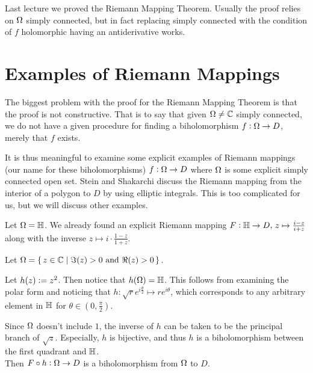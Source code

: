 \setcounter{section}{0}
\setcounter{theorem}{0}


Last lecture we proved the Riemann Mapping Theorem. Usually the proof relies on $\Omega$ simply connected, but in fact replacing simply connected with the condition of $f$ holomorphic having an antiderivative works.

\section{Examples of Riemann Mappings}


The biggest problem with the proof for the Riemann Mapping Theorem is that the proof is not constructive. That is to say that given $\Omega \neq \mathbb{C}$ simply connected, we do not have a given procedure for finding a biholomorphism $f : \Omega \to D$, merely that $f$ exists.

It is thus meaningful to examine some explicit examples of Riemann mappings (our name for these biholomorphisms) $ f : \Omega \to D $ where $\Omega$ is some explicit simply connected open set. Stein and Shakarchi discuss the Riemann mapping from the interior of a polygon to $D$ by using elliptic integrals. This is too complicated for us, but we will discuss other examples.

\begin{example}

Let $\Omega = \mathbb{H}$. We already found an explicit Riemann mapping $F : \mathbb{H} \to D, \, z \mapsto \frac{i - z}{i+z}$ along with the inverse $z \mapsto i \cdot \frac{1-z}{1+z}$.

\end{example}

\begin{example}
Let $\Omega = \set{ z \in \mathbb{C}\mid \Im (z) > 0 \text{ and } \Re (z) >0 }$.

Let $h(z) \vcentcolon = z^2$. Then notice that $h(\Omega ) = \mathbb{H}$. This follows from examining the polar form and noticing that $h: \sqrt{r} e ^{i \frac{\theta}{2}  } \mapsto re^{i \theta}$, which corresponds to any arbitrary element in $\mathbb{H}$ for $\theta \in (0,\frac{\pi}{2} )$.


Since $\Omega$ doesn't include $1$, the inverse of $h$ can be taken to be the principal branch of $\sqrt{z}$. Especially, $h$ is bijective, and thus $h$ is a biholomorphism between the first quadrant and $\mathbb{H}$.\\

Then $F \circ h : \Omega \to D$ is a biholomorphism from $\Omega$ to $D$.
\end{example}

